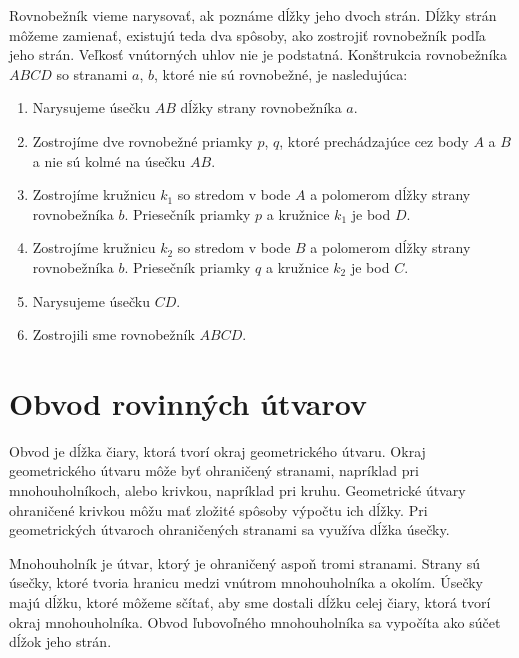 \documentclass{article}
\begin{document}
Rovnobežník vieme narysovať, ak poznáme dĺžky jeho dvoch strán. Dĺžky strán môžeme zamienať, existujú teda dva spôsoby, ako zostrojiť rovnobežník podľa jeho strán. Veľkosť vnútorných uhlov nie je podstatná. Konštrukcia rovnobežníka \(ABCD\) so stranami \(a\), \(b\), ktoré nie sú rovnobežné, je nasledujúca:
\begin{enumerate}[label=\arabic*)]
  \item Narysujeme úsečku \(AB\) dĺžky strany rovnobežníka \(a\).
  \item Zostrojíme dve rovnobežné priamky \(p\), \(q\), ktoré prechádzajúce cez body \(A\) a \(B\) a nie sú kolmé na úsečku \(AB\).
  \item Zostrojíme kružnicu \(k_1\) so stredom v bode \(A\) a polomerom dĺžky strany rovnobežníka \(b\). Priesečník priamky \(p\) a kružnice \(k_1\) je bod \(D\).
  \item Zostrojíme kružnicu \(k_2\) so stredom v bode \(B\) a polomerom dĺžky strany rovnobežníka \(b\). Priesečník priamky \(q\) a kružnice \(k_2\) je bod \(C\).
  \item Narysujeme úsečku \(CD\).
  \item Zostrojili sme rovnobežník \(ABCD\).
\end{enumerate}

\section{Obvod rovinných útvarov}

Obvod je dĺžka čiary, ktorá tvorí okraj geometrického útvaru. Okraj geometrického útvaru môže byť ohraničený stranami, napríklad pri mnohouholníkoch, alebo krivkou, napríklad pri kruhu. Geometrické útvary ohraničené krivkou môžu mať zložité spôsoby výpočtu ich dĺžky. Pri geometrických útvaroch ohraničených stranami sa využíva dĺžka úsečky.

Mnohouholník je útvar, ktorý je ohraničený aspoň tromi stranami. Strany sú úsečky, ktoré tvoria hranicu medzi vnútrom mnohouholníka a okolím. Úsečky majú dĺžku, ktoré môžeme sčítať, aby sme dostali dĺžku celej čiary, ktorá tvorí okraj mnohouholníka. Obvod ľubovoľného mnohouholníka sa vypočíta ako súčet dĺžok jeho strán.
\end{document}
